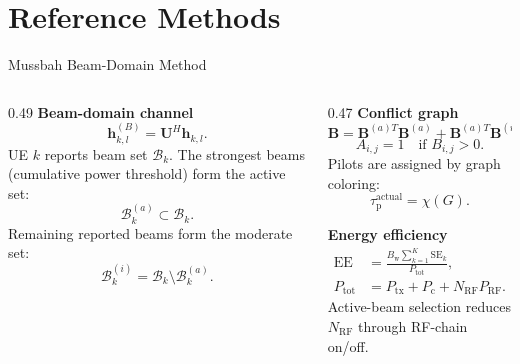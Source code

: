 \documentclass[10pt,aspectratio=169]{beamer}
\newcommand{\tauactual}{\tau_{\mathrm{p}}^{\mathrm{actual}}}
\begin{document}
\section{Reference Methods}

\begin{frame}{Mussbah Beam-Domain Method}
    \small
    \begin{columns}[T,onlytextwidth]
        \begin{column}{0.49\textwidth}
            \textbf{Beam-domain channel}
            \[
                \mathbf{h}_{k,l}^{(B)}=\mathbf{U}^{H}\mathbf{h}_{k,l}.
            \]
            UE \(k\) reports beam set \(\mathcal{B}_k\). The strongest beams (cumulative power threshold) form the active set:
            \[
                \mathcal{B}_k^{(a)} \subset \mathcal{B}_k.
            \]
            Remaining reported beams form the moderate set:
            \[
                \mathcal{B}_k^{(i)}
                =
                \mathcal{B}_k\setminus\mathcal{B}_k^{(a)}.
            \]
        \end{column}
        \begin{column}{0.47\textwidth}
            \textbf{Conflict graph}
            \[
                \mathbf{B}
                =
                \mathbf{B}^{(a)T}\mathbf{B}^{(a)}
                +
                \mathbf{B}^{(a)T}\mathbf{B}^{(i)}
                +
                \mathbf{B}^{(i)T}\mathbf{B}^{(a)}.
            \]
            \[
                A_{i,j}=1 \quad \text{if } B_{i,j}>0.
            \]
            Pilots are assigned by graph coloring:
            \[
                \tauactual = \chi(G).
            \]
            
            \vspace{0.25em}
            \textbf{Energy efficiency}
            \[
                \begin{aligned}
                    \mathrm{EE}
                     & =
                    \frac{B_{\mathrm{w}}\sum_{k=1}^{K}\mathrm{SE}_k}{P_{\mathrm{tot}}}, \\
                    P_{\mathrm{tot}}
                     & =
                    P_{\mathrm{tx}}+P_{\mathrm{c}}+N_{\mathrm{RF}}P_{\mathrm{RF}}.
                \end{aligned}
            \]
            \scriptsize Active-beam selection reduces \(N_{\mathrm{RF}}\) through RF-chain on/off.
        \end{column}
    \end{columns}
    

\end{frame}
\end{document}

